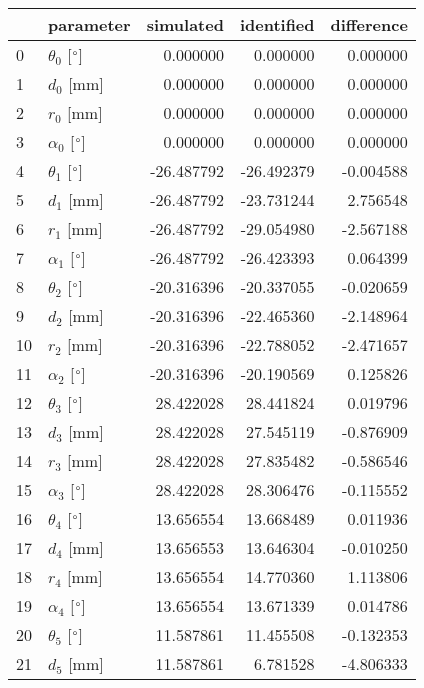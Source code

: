 \documentclass{standalone}%
\begin{document}
%
\normalsize%
\begin{tabular}{llrrr}
\toprule
{} &                 parameter &  simulated & identified & difference \\
\midrule
0  &  $\theta_{0}$ [$\degree$] &   0.000000 &   0.000000 &   0.000000 \\
1  &              $d_{0}$ [mm] &   0.000000 &   0.000000 &   0.000000 \\
2  &              $r_{0}$ [mm] &   0.000000 &   0.000000 &   0.000000 \\
3  &  $\alpha_{0}$ [$\degree$] &   0.000000 &   0.000000 &   0.000000 \\
4  &  $\theta_{1}$ [$\degree$] & -26.487792 & -26.492379 &  -0.004588 \\
5  &              $d_{1}$ [mm] & -26.487792 & -23.731244 &   2.756548 \\
6  &              $r_{1}$ [mm] & -26.487792 & -29.054980 &  -2.567188 \\
7  &  $\alpha_{1}$ [$\degree$] & -26.487792 & -26.423393 &   0.064399 \\
8  &  $\theta_{2}$ [$\degree$] & -20.316396 & -20.337055 &  -0.020659 \\
9  &              $d_{2}$ [mm] & -20.316396 & -22.465360 &  -2.148964 \\
10 &              $r_{2}$ [mm] & -20.316396 & -22.788052 &  -2.471657 \\
11 &  $\alpha_{2}$ [$\degree$] & -20.316396 & -20.190569 &   0.125826 \\
12 &  $\theta_{3}$ [$\degree$] &  28.422028 &  28.441824 &   0.019796 \\
13 &              $d_{3}$ [mm] &  28.422028 &  27.545119 &  -0.876909 \\
14 &              $r_{3}$ [mm] &  28.422028 &  27.835482 &  -0.586546 \\
15 &  $\alpha_{3}$ [$\degree$] &  28.422028 &  28.306476 &  -0.115552 \\
16 &  $\theta_{4}$ [$\degree$] &  13.656554 &  13.668489 &   0.011936 \\
17 &              $d_{4}$ [mm] &  13.656553 &  13.646304 &  -0.010250 \\
18 &              $r_{4}$ [mm] &  13.656554 &  14.770360 &   1.113806 \\
19 &  $\alpha_{4}$ [$\degree$] &  13.656554 &  13.671339 &   0.014786 \\
20 &  $\theta_{5}$ [$\degree$] &  11.587861 &  11.455508 &  -0.132353 \\
21 &              $d_{5}$ [mm] &  11.587861 &   6.781528 &  -4.806333 \\

\end{tabular}
\end{document}
